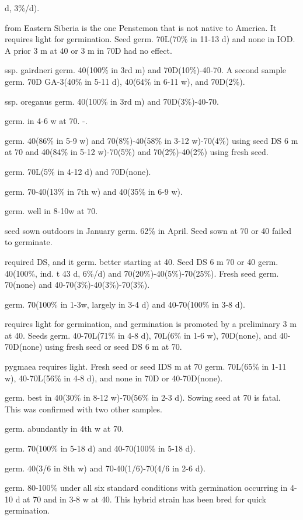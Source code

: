 \begin{description}
d, 3\%/d).
\item[P. frutescens] from Eastern Siberia is the one Penstemon that is not native to
America. It requires light for germination. Seed germ. 70L(70\% in 11-13 d) and none
in IOD. A prior 3 m at 40 or 3 m in 70D had no effect.
\item[P. gairdneri] ssp. gairdneri germ. 40(100\% in 3rd m) and 70D(10\%)-40-70. A
second sample germ. 70D GA-3(40\% in 5-11 d), 40(64\% in 6-11 w), and 70D(2\%).
\item[P. gairdneri] ssp. oreganus germ. 40(100\% in 3rd m) and 70D(3\%)-40-70.
\item[P. glaber] germ. in 4-6 w at 70. -.
\item[P. glabrescens] germ. 40(86\% in 5-9 w) and 70(8\%)-40(58\% in 3-12 w)-70(4\%)
using seed DS 6 m at 70 and 40(84\% in 5-12 w)-70(5\%) and 70(2\%)-40(2\%) using
fresh seed.
\item[P. globosus] germ. 70L(5\% in 4-12 d) and 70D(none).
\item[P. goodrichii] germ. 70-40(13\% in 7th w) and 40(35\% in 6-9 w).
\item[P. gormani] germ. well in 8-10w at 70.

\item[P. gracilis] seed sown outdoors in January germ. 62\% in April. Seed sown at
70 or 40 failed to germinate.
\item[P. grandiflora] required DS, and it germ. better starting at 40. Seed DS 6 m 70
or 40 germ. 40(100\%, ind. t 43 d, 6\%/d) and 70(20\%)-40(5\%)-70(25\%). Fresh seed
germ. 70(none) and 40-70(3\%)-40(3\%)-70(3\%).
\item[P. hallii] germ. 70(100\% in 1-3w, largely in 3-4 d) and 40-70(100\% in 3-8 d).
\item[P. hirsutus] requires light for germination, and germination is promoted by a
preliminary 3 m at 40. Seeds germ. 40-70L(71\% in 4-8 d), 70L(6\% in 1-6 w),
70D(none), and 40-70D(none) using fresh seed or seed DS 6 m at 70.
\item[P. hirsutus] pygmaea requires light. Fresh seed or seed IDS m at 70 germ.
70L(65\% in 1-11 w), 40-70L(56\% in 4-8 d), and none in 70D or 40-70D(none).
\item[P. humilis] germ. best in 40(30\% in 8-12 w)-70(56\% in 2-3 d). Sowing seed at
70 is fatal. This was confirmed with two other samples.
\item[P. hyacinthus] germ. abundantly in 4th w at 70.
\item[P. jamesii] germ. 70(100\% in 5-18 d) and 40-70(100\% in 5-18 d).
\item[P. janishae] germ. 40(3/6 in 8th w) and 70-40(1/6)-70(4/6 in 2-6 d).
\item[P. johnsoniae] germ. 80-100\% under all six standard conditions with
germination occurring in 4-10 d at 70 and in 3-8 w at 40. This hybrid strain has been
bred for quick germination.


\end{description}

